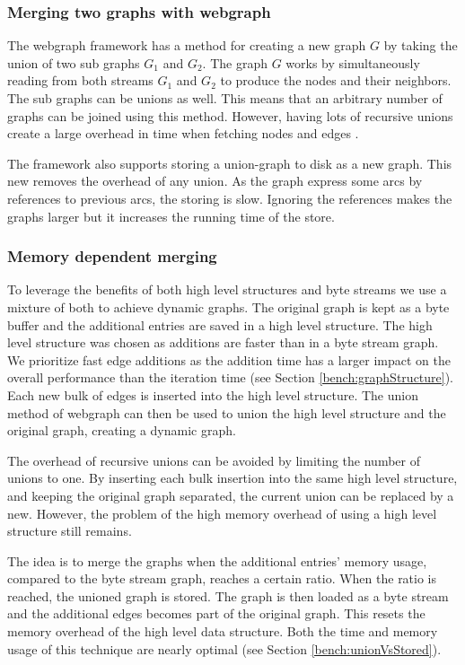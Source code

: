 \subsubsection{Merging two graphs with webgraph}
The webgraph framework has a method for creating a new graph $G$ by taking the union of two sub graphs $G_1$ and $G_2$. The graph $G$ works by simultaneously reading from both streams $G_1$ and $G_2$ to produce the nodes and their neighbors. The sub graphs can be unions as well. This means that an arbitrary number of graphs can be joined using this method. However, having lots of recursive unions create a large overhead in time when fetching nodes and edges \cite{webgraph}. 

The framework also supports storing a union-graph to disk as a new graph. This new removes the overhead of any union. As the graph express some arcs by references to previous arcs, the storing is slow. Ignoring the references makes the graphs larger but it increases the running time of the store.

\subsubsection{Memory dependent merging}
To leverage the benefits of both high level structures and byte streams we use a mixture of both to achieve dynamic graphs. The original graph is kept as a byte buffer and the additional entries are saved in a high level structure. The high level structure was chosen as additions are faster than in a byte stream graph. We prioritize fast edge additions as the addition time has a larger impact on the overall performance than the iteration time (see Section \ref{bench:graphStructure}). Each new bulk of edges is inserted into the high level structure. The union method of webgraph can then be used to union the high level structure and the original graph, creating a dynamic graph.

The overhead of recursive unions can be avoided by limiting the number of unions to one. By inserting each bulk insertion into the same high level structure, and keeping the original graph separated, the current union can be replaced by a new. However, the problem of the high memory overhead of using a high level structure still remains. 

The idea is to merge the graphs when the additional entries' memory usage, compared to the byte stream graph, reaches a certain ratio. When the ratio is reached, the unioned graph is stored. The graph is then loaded as a byte stream and the additional edges becomes part of the original graph. This resets the memory overhead of the high level data structure. Both the time and memory usage of this technique are nearly optimal (see Section \ref{bench:unionVsStored}).

